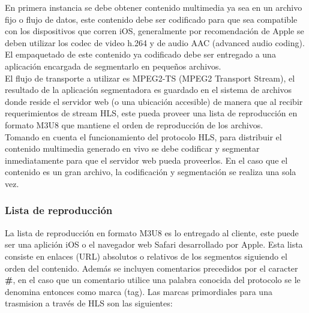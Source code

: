 En primera instancia se debe obtener contenido multimedia ya sea en un archivo fijo o flujo de datos, este contenido debe ser codificado para que sea compatible con los dispositivos que corren iOS, generalmente por recomendación de Apple se deben utilizar los codec de video h.264 y de audio AAC (advanced audio coding). El empaquetado de este contenido ya codificado debe ser entregado a una aplicación encargada de segmentarlo en pequeños archivos. \\
	El flujo de transporte a utilizar es MPEG2-TS (MPEG2 Transport Stream), el resultado de la aplicación segmentadora es guardado en el sistema de archivos donde reside el servidor web (o una ubicación accesible) de manera que al recibir requerimientos de stream HLS, este pueda proveer una lista de reproducción en formato M3U8 que mantiene el orden de reproducción de los archivos.\\
	
Tomando en cuenta el funcionamiento del protocolo HLS, para distribuir el contenido multimedia generado en vivo se debe codificar y segmentar inmediatamente para que el servidor web pueda proveerlos. En el caso que el contenido es un gran archivo, la codificación y segmentación se realiza una sola vez.

\subsubsection{Lista de reproducción}
\label{TAG-SECTION}
La lista de reproducción en formato M3U8 es lo entregado al cliente, este puede ser una aplición iOS o el navegador web Safari desarrollado por Apple. Esta lista consiste en enlaces (URL) absolutos o relativos de los segmentos siguiendo el orden del contenido. Además se incluyen comentarios precedidos por el caracter \textbf{\#}, en el caso que un comentario utilice una palabra conocida del protocolo se le denomina entonces como marca (tag).
Las marcas primordiales para una trasmision a través de HLS son las siguientes:

